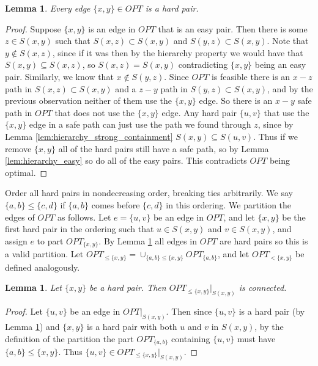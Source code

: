 \documentclass[11pt,letterpaper]{article}
\newtheorem{lemma}[theorem]{Lemma}
\theoremstyle{definition}
\begin{document}
\begin{lemma} \label{lem:hierarchy_OPT_hard}
  Every edge $\{x,y\} \in OPT$ is a hard pair.
\end{lemma}
\begin{proof}
  Suppose $\{x,y\}$ is an edge in $OPT$ that is an easy pair.  Then
  there is some $z \in S(x,y)$ such that $S(x,z) \subset S(x,y)$ and
  $S(y,z) \subset S(x,y)$.  Note that $y \not\in S(x,z)$, since if it
  was then by the hierarchy property we would have that $S(x,y)
  \subseteq S(x,z)$, so $S(x,z) = S(x,y)$ contradicting $\{x,y\}$
  being an easy pair.  Similarly, we know that $x \not\in S(y,z)$.
  Since $OPT$ is feasible there is an $x-z$ path in $S(x,z) \subset
  S(x,y)$ and a $z-y$ path in $S(y,z) \subset S(x,y)$, and by the
  previous observation neither of them use the $\{x,y\}$ edge.  So
  there is an $x-y$ safe path in $OPT$ that does not use the $\{x,y\}$
  edge.  Any hard pair $\{u,v\}$ that use the $\{x,y\}$ edge in a safe
  path can just use the path we found through $z$, since by Lemma
  \ref{lem:hierarchy_strong_containment} $S(x,y) \subseteq S(u,v)$.
  Thus if we remove $\{x,y\}$ all of the hard pairs still have a safe
  path, so by Lemma \ref{lem:hierarchy_easy} so do all of the easy
  pairs.  This contradicts $OPT$ being optimal.
\end{proof}

Order all hard pairs in nondecreasing order, breaking ties
arbitrarily.  We say $\{a,b\} \leq \{c,d\}$ if $\{a,b\}$ comes before
$\{c,d\}$ in this ordering.  We partition the edges of $OPT$ as
follows.  Let $e = \{u,v\}$ be an edge in $OPT$, and let $\{x,y\}$ be
the first hard pair in the ordering such that $u \in S(x,y)$ and $v
\in S(x,y)$, and assign $e$ to part $OPT_{\{x,y\}}$.  By Lemma
\ref{lem:hierarchy_OPT_hard} all edges in $OPT$ are hard pairs so this
is a valid partition.  Let $OPT_{\leq \{x,y\}} = \cup_{\{a,b\} \leq
  \{x,y\}} OPT_{\{a,b\}}$, and let $OPT_{< \{x,y\}}$ be defined
analogously.

\begin{lemma} \label{lem:hierarchy_OPT_connected}
  Let $\{x,y\}$ be a hard pair.  Then $OPT_{\leq \{x,y\}} |_{S(x,y)}$
  is connected.
\end{lemma}
\begin{proof}
  Let $\{u,v\}$ be an edge in $OPT|_{S(x,y)}$.  Then since $\{u,v\}$
  is a hard pair (by Lemma \ref{lem:hierarchy_OPT_hard}) and $\{x,y\}$
  is a hard pair with both $u$ and $v$ in $S(x,y)$, by the definition
  of the partition the part $OPT_{\{a,b\}}$ containing $\{u,v\}$ must
  have $\{a,b\} \leq \{x,y\}$.  Thus $\{u,v\} \in OPT_{\leq \{x,y\}}
  |_{S(x,y)}$.
\end{proof}
\end{document}
